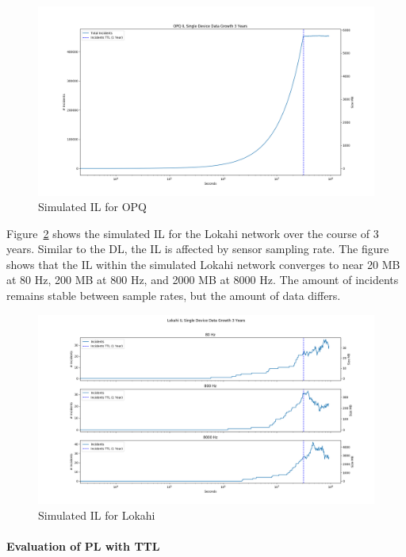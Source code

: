 \begin{figure}[H]
	\centering
	\includegraphics[width=\linewidth]{figures/sim_il_opq.png}
	\caption{Simulated IL for OPQ}
	\label{fig:sim_il_opq}
\end{figure}

Figure~\ref{fig:sim_il_lokahi} shows the simulated IL for the Lokahi network over the course of 3 years. Similar to the DL, the IL is affected by sensor sampling rate. The figure shows that the IL within the simulated Lokahi network converges to near 20 MB at 80 Hz, 200 MB at 800 Hz, and 2000 MB at 8000 Hz. The amount of incidents remains stable between sample rates, but the amount of data differs.

\begin{figure}[H]
	\centering
	\includegraphics[width=\linewidth]{figures/sim_il_lokahi.png}
	\caption{Simulated IL for Lokahi}
	\label{fig:sim_il_lokahi}
\end{figure}

\paragraph{Evaluation of PL with TTL}

